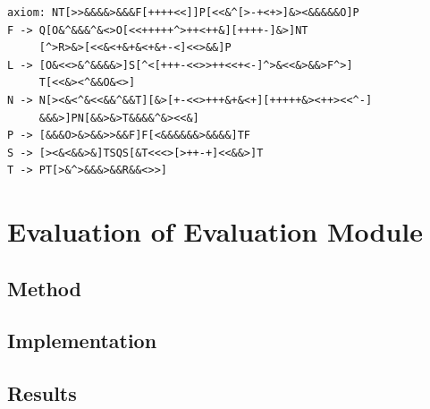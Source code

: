\begin{lstlisting}[caption=L-system representation of plant in Figure~\ref{fig:sa-plant}, label=lst:sa-plant, float]
axiom: NT[>>&&&&>&&&F[++++<<]]P[<<&^[>-+<+>]&><&&&&&O]P
F -> Q[O&^&&&^&<>O[<<+++++^>++<++&][++++-]&>]NT
     [^>R>&>[<<&<+&+&<+&+-<]<<>&&]P
L -> [O&<<>&^&&&&>]S[^<[+++-<<>>++<<+<-]^>&<<&>&&>F^>]
     T[<<&><^&&O&<>]
N -> N[><&<^&<<&&^&&T][&>[+-<<>+++&+&<+][+++++&><++><<^-]
     &&&>]PN[&&>&>T&&&&^&><<&]
P -> [&&&O>&>&&>>&&F]F[<&&&&&&>&&&&]TF
S -> [><&<&&>&]TSQS[&T<<<>[>++-+]<<&&>]T
T -> PT[>&^>&&&>&&R&&<>>]
\end{lstlisting}

\section{Evaluation of Evaluation Module}
\subsection{Method}
\subsection{Implementation}
\subsection{Results}
